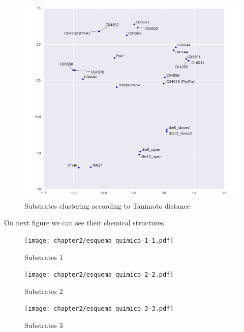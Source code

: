 \documentclass[12pt,twoside]{reedthesis}
\begin{document}
  \begin{figure}[h!tbp]
  \centering
  \includegraphics[angle = 0,scale = 0.6]{chapter2/SubstratesClustering.png}
  \caption[Substrates clustering according to Tanimoto distance]{\normalsize{Substrates clustering according to Tanimoto distance}}
  \label{fig:Substrates Tanimoto distance}
  \end{figure}
  
  On next figure we can see their chemical structures.
  
  \clearpage   
  
  \begin{figure}[h!tbp]
   \centering
   \texttt{[image: chapter2/esquema\_quimico-1-1.pdf]}
   \caption[Substrates 1]{\normalsize{Substrates 1}}
   \label{fig:Substrates chemical 1}
   \end{figure}
  
  \begin{figure}[h!tbp]
   \centering
   \texttt{[image: chapter2/esquema\_quimico-2-2.pdf]}
   \caption[Substrates 2]{\normalsize{Substrates 2}}
   \label{fig:Substrates chemical 2}
   \end{figure}
  
  \begin{figure}[h!tbp]
   \centering
   \texttt{[image: chapter2/esquema\_quimico-3-3.pdf]}
   \caption[Substrates 3]{\normalsize{Substrates 3}}
   \label{fig:Substrates chemical 3}
   \end{figure}
  
\end{document}
